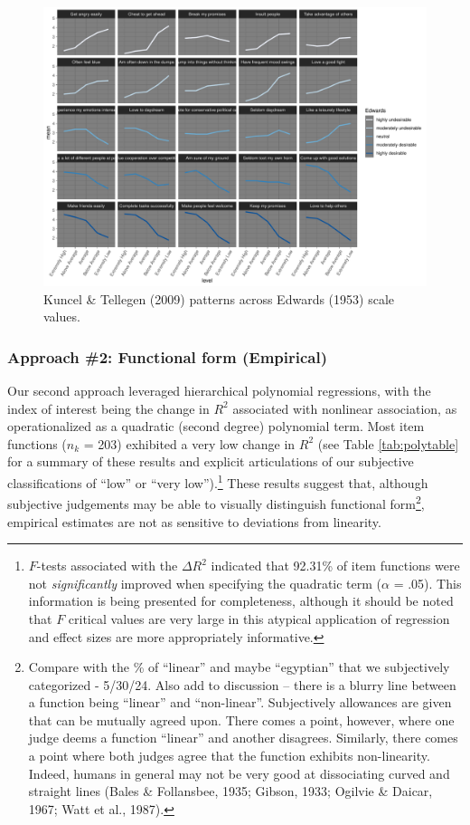 \documentclass[
  ,jou]{apa6}
\begin{document}
\begin{figure}
\centering
\includegraphics{FullStudy_files/figure-latex/Figure2-1.pdf}
\caption{\label{fig:Figure2}Kuncel \& Tellegen (2009) patterns across Edwards (1953) scale values.}
\end{figure}

\subsubsection{Approach \#2: Functional form (Empirical)}\label{approach-2-functional-form-empirical}

Our second approach leveraged hierarchical polynomial regressions, with the index of interest being the change in \(R^2\) associated with nonlinear association, as operationalized as a quadratic (second degree) polynomial term. Most item functions (\(n_k\) = 203) exhibited a very low change in \(R^2\) (see Table \ref{tab:polytable} for a summary of these results and explicit articulations of our subjective classifications of ``low'' or ``very low'').\footnote{\(F\)-tests associated with the \(\Delta R^2\) indicated that 92.31\% of item functions were not \emph{significantly} improved when specifying the quadratic term (\(\alpha\) = .05). This information is being presented for completeness, although it should be noted that \(F\) critical values are very large in this atypical application of regression and effect sizes are more appropriately informative.} These results suggest that, although subjective judgements may be able to visually distinguish functional form\footnote{Compare with the \% of ``linear'' and maybe ``egyptian'' that we subjectively categorized - 5/30/24. Also add to discussion -- there is a blurry line between a function being ``linear'' and ``non-linear''. Subjectively allowances are given that can be mutually agreed upon. There comes a point, however, where one judge deems a function ``linear'' and another disagrees. Similarly, there comes a point where both judges agree that the function exhibits non-linearity. Indeed, humans in general may not be very good at dissociating curved and straight lines (Bales \& Follansbee, 1935; Gibson, 1933; Ogilvie \& Daicar, 1967; Watt et al., 1987).}, empirical estimates are not as sensitive to deviations from linearity.
\end{document}
